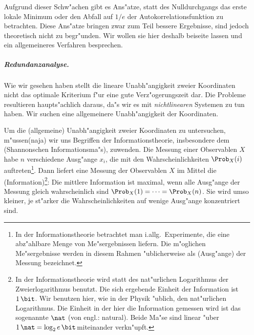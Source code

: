 Aufgrund dieser Schw"achen gibt es Ans"atze, statt des Nulldurchgangs das erste lokale
Minimum oder den Abfall auf $1/e$ der Autokorrelationsfunktion zu betrachten. Diese
Ans"atze bringen zwar zum Teil bessere Ergebnisse, sind jedoch theoretisch nicht zu
begr"unden. Wir wollen sie hier deshalb beiseite lassen und ein allgemeineres Verfahren
besprechen.

\subparagraph{Redundanzanalyse.}  Wie wir gesehen haben stellt die lineare
Un\-ab\-h"an\-gig\-keit zweier Koordinaten nicht das optimale Kriterium f"ur eine gute
Verz"ogerungszeit dar. Die Probleme resultieren haupts"achlich daraus, da"s wir es mit
\emph{nichtlinearen} Systemen zu tun haben. Wir suchen eine allgemeinere Unabh"angigkeit
der Koordinaten.


\comment{Sei $X$ eine beliebige Zufallsvariable und $\Prob_X(i)$ die Wahrscheinlichkeit
  bei einer Messung von $X$ einen Wert im Intervall $[x_i,x_{i+1}[$ zu erhalten. Dann
  betr"agt die mittlere Information einer Messung von $X$}

Um die \begriff(allgemeine) Unabh"angigkeit zweier Koordinaten zu untersuchen,
m"ussen\korrektur(naja) wir uns Begriffen der Informationstheorie, insbesondere dem
\begriff(Shannonschen Informationsma"s), zuwenden. Die Messung einer Observablen $X$ habe
$n$ verschiedene Ausg"ange $x_i$, die mit den Wahrscheinlichkeiten $\Prob_X(i)$
auftreten\footnote{In der Informationstheorie betrachtet man i.allg.\  Experimente, 
  die eine abz"ahlbare Menge von Me"sergebnissen liefern. Die m"oglichen Me"sergebnisse
  werden in diesem Rahmen "ublicherweise als \begriff(Ausg"ange) der Messung bezeichnet.}.
Dann liefert eine Messung der Observablen $X$ im Mittel die
\begriff(Information)\footnote{In der Informationstheorie wird statt des nat"urlichen
  Logarithmus der Zweierlogarithmus benutzt. Die sich ergebende Einheit der Information
  ist $1\,\bit$. Wir benutzen hier, wie in der Physik "ublich, den nat"urlichen
  Logarithmus. Die Einheit in der hier die Information gemessen wird ist das sogenannte
  $\nat$ (von engl.: natural). Beide Ma"se sind linear "uber $1\,\nat =\log_2
  e\,\bit\,$miteinander verkn"upft.}:
Die
mittlere Information ist maximal, wenn alle Ausg"ange der Messung gleich wahrscheinlich
sind $\Prob_X(1)=\dots=\Prob_X(n)$. Sie wird umso kleiner, je st"arker die
Wahrscheinlichkeiten auf wenige Ausg"ange konzentriert sind.

